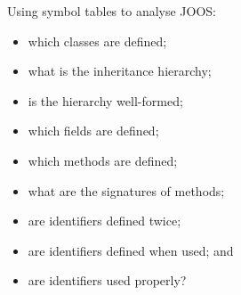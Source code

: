 \begin{slide*}
Using symbol tables to analyse JOOS:

\begin{itemize}
\item which classes are defined;
\item what is the inheritance hierarchy;
\item is the hierarchy well-formed;
\item which fields are defined;
\item which methods are defined;
\item what are the signatures of methods;
\item are identifiers defined twice;
\item are identifiers defined when used; and
\item are identifiers used properly?
\end{itemize}
\vfil
\end{slide*}
 
